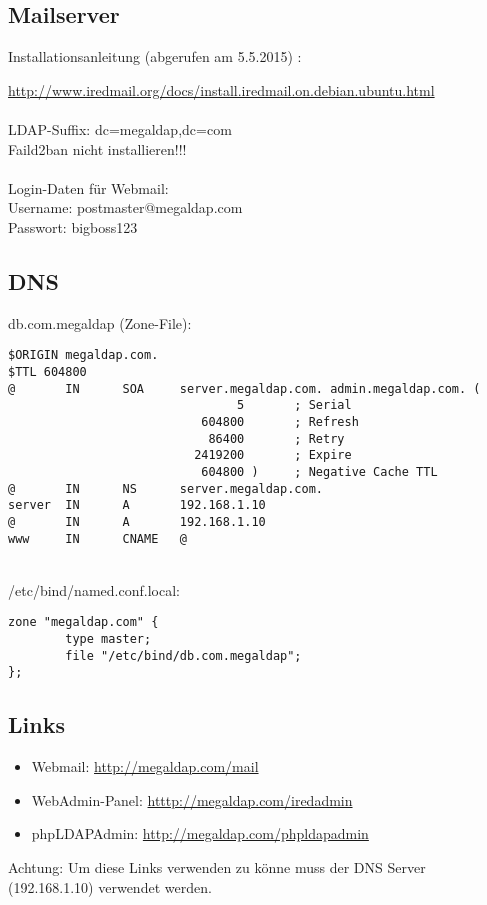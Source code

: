 \documentclass[main.tex]{subfiles}
\begin{document}
\subsection{Mailserver}

Installationsanleitung (abgerufen am 5.5.2015) :

\url{http://www.iredmail.org/docs/install.iredmail.on.debian.ubuntu.html}
\\\\
LDAP-Suffix: dc=megaldap,dc=com\\
Faild2ban nicht installieren!!!
\\\\
Login-Daten für Webmail:\\
Username: postmaster@megaldap.com\\
Passwort: bigboss123
\newpage
\subsection{DNS}

db.com.megaldap (Zone-File):
\begin{lstlisting}
$ORIGIN megaldap.com.
$TTL 604800
@       IN      SOA     server.megaldap.com. admin.megaldap.com. (
                                5       ; Serial
                           604800       ; Refresh
                            86400       ; Retry
                          2419200       ; Expire
                           604800 )     ; Negative Cache TTL
@       IN      NS      server.megaldap.com.
server  IN      A       192.168.1.10
@       IN      A       192.168.1.10
www     IN      CNAME   @
\end{lstlisting}
\leavevmode \\
/etc/bind/named.conf.local:

\begin{lstlisting}
zone "megaldap.com" {
        type master;
        file "/etc/bind/db.com.megaldap";
};
\end{lstlisting}

\subsection{Links}

\begin{itemize}
  \item{Webmail: \url{http://megaldap.com/mail}}
  \item{WebAdmin-Panel:  \url{htttp://megaldap.com/iredadmin}}
  \item{phpLDAPAdmin: \url{http://megaldap.com/phpldapadmin}}
\end{itemize}

Achtung: Um diese Links verwenden zu könne muss der DNS Server (192.168.1.10) verwendet werden.
\end{document}

